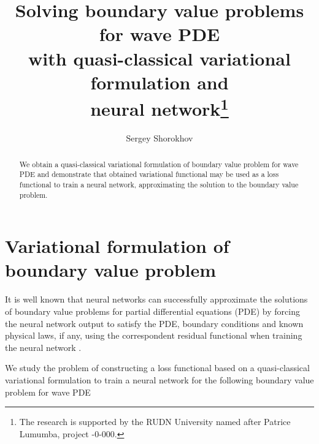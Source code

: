\documentclass[12pt]{llncs}
\begin{document}
\fi
%
\title{Solving boundary value problems for wave PDE \\with quasi-classical variational formulation and \\ neural network\thanks{The research is supported by the RUDN University named after Patrice Lumumba, project -0-000.}}
\author{Sergey Shorokhov %
}

\maketitle

\begin{abstract}
We obtain a quasi-classical variational formulation of boundary value problem for wave PDE and 
demonstrate that obtained variational functional may be used as a loss functional to train a neural network, approximating the solution to the boundary value problem.  

\end{abstract}

\section{Variational formulation of boundary value problem}

It is well known that neural networks can successfully approximate the solutions of boundary value problems for partial differential equations (PDE) by forcing the neural network output to satisfy the PDE, boundary conditions and known physical laws, if any, using the correspondent residual functional when training the neural network \cite{Raissi2019}. 
 
We study the problem of constructing a loss functional based on a quasi-classical variational formulation \cite{Filippov1994} to train a neural network for the following boundary value problem for wave PDE
\end{document}

